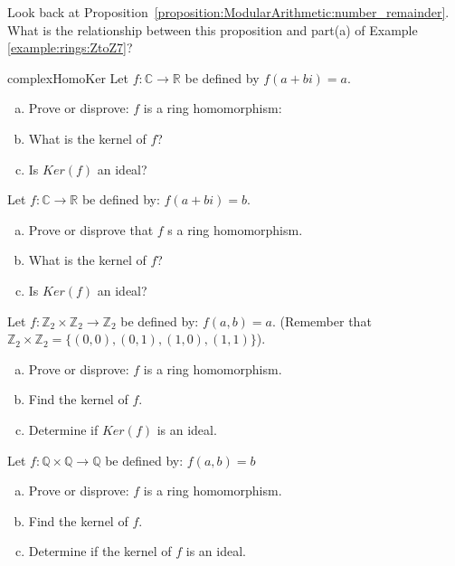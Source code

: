 \begin{exercise}{}
Look back at Proposition~\ref{proposition:ModularArithmetic:number_remainder}.   What is the relationship between this proposition and part(a) of Example \ref{example:rings:ZtoZ7}?
\end{exercise}

\begin{exercise}{complexHomoKer}
Let $f:{\mathbb C}\rightarrow {\mathbb R}$ be defined by $f(a+bi)=a$.

\begin{enumerate}[(a)]
\item Prove or disprove: $f$ is a ring homomorphism:
\item What is the kernel of $f$?
\item Is $Ker(f)$ an ideal?
\end{enumerate}

\end{exercise}

\begin{exercise}{}
Let $f:{\mathbb C}\rightarrow {\mathbb R}$ be defined by: $f(a+bi)=b$.
\begin{enumerate}[(a)]
\item Prove or disprove that $f$ s a ring homomorphism.
\item What is the kernel of $f$?
\item Is $Ker(f)$ an ideal?
\end{enumerate}
\end{exercise}

\begin{exercise}{}
Let $f:{\mathbb Z}_2\times {\mathbb Z}_2\rightarrow {\mathbb Z}_2$ be defined by: $f(a,b)=a$.  (Remember that ${\mathbb Z}_2\times{\mathbb Z}_2=\{(0,0),(0,1),(1,0),(1,1)\}$).
\begin{enumerate}[(a)]
\item Prove or disprove: $f$ is a ring homomorphism.
\item Find the kernel of $f$.
\item Determine if $Ker(f)$ is an ideal.
\end{enumerate}
\end{exercise}
\begin{exercise}{}
Let $f:{\mathbb Q}\times {\mathbb Q}\rightarrow {\mathbb Q}$ be defined by: $f(a,b)=b$
\begin{enumerate}[(a)]
\item Prove or disprove: $f$ is a ring homomorphism.
\item Find the kernel of $f$.
\item Determine if the kernel of $f$ is an ideal.
\end{enumerate}
\end{exercise}


